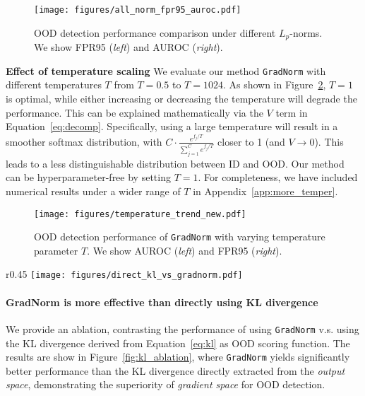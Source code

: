 \documentclass{article}
\begin{document}
\begin{figure}[h]
    \centering
\texttt{[image: figures/all\_norm\_fpr95\_auroc.pdf]}
    \caption{\small{OOD detection performance comparison under different $L_p$-norms. We show FPR95 (\emph{left}) and AUROC (\emph{right}).}}
\label{fig:norm_ablation}
\end{figure}







\textbf{Effect of temperature scaling} We evaluate our method \texttt{GradNorm} with different temperatures $T$ from $T=0.5$ to $T=1024$. As shown in Figure~\ref{fig:temper_ablation}, $T=1$ is optimal, while either increasing or decreasing the temperature will degrade the performance. This can be explained mathematically via the $V$ term in Equation~\ref{eq:decomp}. Specifically, using a large temperature will result in a smoother softmax distribution, with $C \cdot \frac{e^{f_j / T}}{\sum_{j=1}^C e^{{f_{j}} / T}}$ closer to 1 (and $V\rightarrow 0$). This leads to a less distinguishable distribution between ID and OOD. Our method can be hyperparameter-free by setting $T=1$. For completeness, we have included numerical results under a wider range of $T$ in Appendix~\ref{app:more_temper}.


\begin{figure}[h]
\centering
    \vspace{-0.2cm}
    \texttt{[image: figures/temperature\_trend\_new.pdf]}
\caption{\small{OOD detection performance of \texttt{GradNorm} with varying temperature parameter $T$. We show AUROC (\emph{left}) and FPR95 (\emph{right}).}}
    \label{fig:temper_ablation}
\end{figure}

\begin{wrapfigure}{r}{0.45\textwidth}
\vspace{-1.5cm}
    \texttt{[image: figures/direct\_kl\_vs\_gradnorm.pdf]}
    \vspace{-0.3cm}
    \caption{\small{Comparison between \texttt{GradNorm} v.s. directly using the KL divergence as scoring function.}}
    \vspace{-0.5cm}
    \label{fig:kl_ablation}
\end{wrapfigure}

\vspace{-0.2cm}
\paragraph{{GradNorm} is more effective than directly using KL divergence} We provide an ablation, contrasting the performance of using \texttt{GradNorm} v.s. using the KL divergence derived from Equation~\ref{eq:kl} as OOD scoring function. The results are show in Figure~\ref{fig:kl_ablation}, where \texttt{GradNorm} yields significantly better performance than the KL divergence directly extracted from the \emph{output space}, demonstrating the superiority of \emph{gradient space} for OOD detection.
\end{document}
